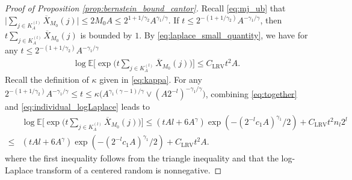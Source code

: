 \documentclass[11pt]{article}
\theoremstyle{plain}
\theoremstyle{definition}
\begin{document}
\begin{proof}[Proof of Proposition \ref{prop:bernstein_bound_cantor}]
    Recall \eqref{eq:mj_ub} that $\big|\sum_{j \in K_{A}^{(l)}}\overline{X}_{M_0}(j)\big| \leq 2M_0A \leq 2^{1+1/\gamma_2}A^{\gamma_1/\gamma}$.
    If $t \leq 2^{-(1+1/\gamma_2)}A^{-\gamma_1/\gamma}$, then $t\sum_{j \in K_{A}^{(l)}}\overline{X}_{M_0}(j)$ is bounded by $1$. By \eqref{eq:laplace_small_quantity}, we have for any $t \leq 2^{-(1+1/\gamma_2)}A^{-\gamma_1/\gamma}$
    \begin{equation*}
        \begin{aligned}
        \log\mathbb{E}\Big[\exp\Big(t\sum_{j \in K_{A}^{(l)}}\overline{X}_{M_0}(j)\Big)\Big] \leq C_{\mathrm{LRV}}t^2A.
    \end{aligned}
    \end{equation*}
    Recall the definition of $\kappa$ given in \eqref{eq:kappa}. For any $2^{-(1+1/\gamma_2)}A^{-\gamma_1/\gamma} \leq t \leq \kappa\big(A^{\gamma_1(\gamma-1)/\gamma} \vee (A2^{-l})^{-\gamma_1/\gamma}\big)$, combining \eqref{eq:together} and \eqref{eq:individual_logLaplace} leads to
    \begin{equation*}
    \begin{aligned}
        &\log\mathbb{E}\Big[\exp\Big(t\sum_{j \in K_{A}^{(l)}}\overline{X}_{M_0}(j)\Big)\Big]\leq (tAl + 6A^{\gamma})\exp(-(2^{-l}c_1A)^{\gamma_1}/2) + C_{\mathrm{LRV}}t^2n_l2^l\\
        \leq& (tAl + 6A^{\gamma})\exp(-(2^{-l}c_1A)^{\gamma_1}/2) + C_{\mathrm{LRV}}t^2A.
    \end{aligned}
    \end{equation*}
    where the first inequality follows from the triangle inequality and that the log-Laplace transform of a centered random is nonnegative.
\end{proof}
\end{document}
